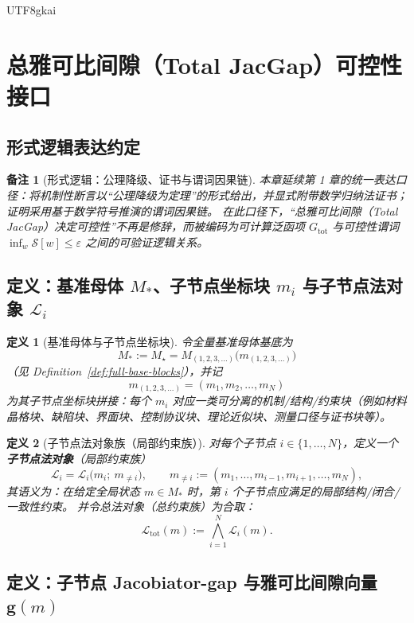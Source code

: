 \documentclass[12pt]{article}
\newtheorem{definition}{定义}[section]
\newtheorem{remark}{备注}[section]
\begin{document}
\begin{CJK*}{UTF8}{gkai}
\section{总雅可比间隙（Total JacGap）可控性接口}
\label{sec:ptopb-rtsc-total-jacgap}

\subsection{形式逻辑表达约定}

\begin{remark}[形式逻辑：公理降级、证书与谓词因果链]
本章延续第 1 章的统一表达口径：将机制性断言以“公理降级为定理”的形式给出，并显式附带数学归纳法证书；证明采用基于数学符号推演的谓词因果链。
在此口径下，“总雅可比间隙（Total JacGap）决定可控性”不再是修辞，而被编码为可计算泛函项 $G_{\mathrm{tot}}$ 与可控性谓词 $\inf_w\mathcal{S}[w]\le \varepsilon$
  之间的可验证逻辑关系。
\end{remark}

\subsection{定义：基准母体 $M_\ast$、子节点坐标块 $m_i$ 与子节点法对象 $\mathcal{L}_i$}

\begin{definition}[基准母体与子节点坐标块]
\label{def:rtsc-jacgap-base-subnodes}
令全量基准母体基底为
\[
M_\ast:=M_\star=M_{(1,2,3,\dots)}\bigl(m_{(1,2,3,\dots)}\bigr)
\]
（见 Definition~\ref{def:full-base-blocks}），并记
\[
m_{(1,2,3,\dots)}=(m_1,m_2,\dots,m_N)
\]
为其子节点坐标块拼接：每个 $m_i$ 对应一类可分离的机制/结构/约束块（例如材料晶格块、缺陷块、界面块、控制协议块、理论近似块、测量口径与证书块等）。
\end{definition}

\begin{definition}[子节点法对象族（局部约束族）]
\label{def:rtsc-subnode-law}
对每个子节点 $i\in\{1,\dots,N\}$，定义一个\textbf{子节点法对象}（局部约束族）
\[
\mathcal{L}_i=\mathcal{L}_i\bigl(m_i;\ m_{\neq i}\bigr),
\qquad
m_{\neq i}:=(m_1,\dots,m_{i-1},m_{i+1},\dots,m_N),
\]
其语义为：在给定全局状态 $m\in M_\ast$ 时，第 $i$ 个子节点应满足的局部结构/闭合/一致性约束。
并令总法对象（总约束族）为合取：
\[
\mathcal{L}_{\mathrm{tot}}(m):=\bigwedge_{i=1}^N \mathcal{L}_i(m).
\]
\end{definition}

\subsection{定义：子节点 Jacobiator-gap 与雅可比间隙向量 $\mathbf{g}(m)$}


\end{CJK*}
\end{document}
